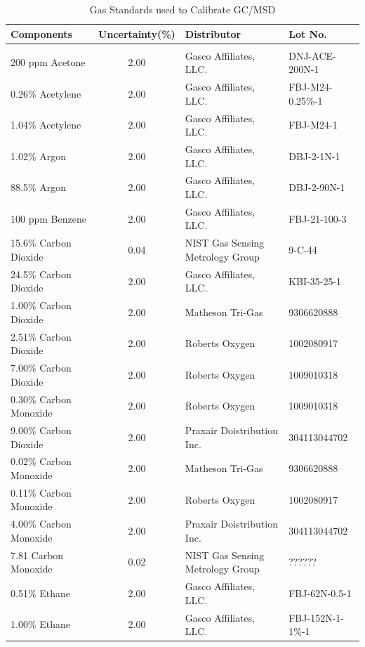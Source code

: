 \documentclass[12pt]{article}
\begin{document}
\begin{table}[h!]

\caption{Gas Standards used to Calibrate GC/MSD}
\label{tab:Gas_Standards_Table}
\centering
	\footnotesize
	\begin{tabular}{lcll}
			\hline
\textbf{Components} &\textbf{Uncertainty(\%)}& \textbf{Distributor}	& \textbf{Lot No.}		\\
\hline
\\[0.001cm]
200 ppm Acetone		&	2.00	&	Gasco Affiliates, LLC. 		&	DNJ-ACE-200N-1		\\
0.26\% Acetylene		&	2.00	&	Gasco Affiliates, LLC.		&	FBJ-M24-0.25\%-1		\\
1.04\% Acetylene		&	2.00	&	Gasco Affiliates, LLC.		&	FBJ-M24-1		\\
1.02\% Argon			&	2.00	&	Gasco Affiliates, LLC.		&	DBJ-2-1N-1		\\
88.5\% Argon			&	2.00	&	Gasco Affiliates, LLC.		&	DBJ-2-90N-1		\\
100 ppm Benzene		&	2.00	&	Gasco Affiliates, LLC.		&	FBJ-21-100-3		\\
15.6\% Carbon Dioxide	&	0.04	&	NIST Gas Sensing Metrology Group		&	9-C-44		\\
24.5\% Carbon Dioxide	&	2.00	&	Gasco Affiliates, LLC. 		&	KBI-35-25-1		\\
1.00\% Carbon Dioxide	&	2.00	&	Matheson Tri-Gas		&	9306620888		\\
2.51\% Carbon Dioxide	&	2.00	&	Roberts Oxygen			&	1002080917		\\
7.00\% Carbon Dioxide	&	2.00	&	Roberts Oxygen			&	1009010318		\\
0.30\% Carbon Monoxide	&	2.00	&	Roberts Oxygen			&	1009010318			\\
9.00\% Carbon Dioxide	&	2.00	&	Praxair Doistribution Inc. 	&	304113044702		\\
0.02\% Carbon Monoxide	&	2.00	&	Matheson Tri-Gas		&	9306620888		\\
0.11\% Carbon Monoxide	&	2.00	&	Roberts Oxygen			&	1002080917		\\
4.00\% Carbon Monoxide	&	2.00	&	Praxair Doistribution Inc. 	&	304113044702		\\
7.81 Carbon Monoxide	&	0.02	&	NIST Gas Sensing Metrology Group 		&	??????		\\
0.51\% Ethane			&	2.00	&	Gasco Affiliates, LLC.		&	FBJ-62N-0.5-1		\\
1.00\% Ethane			&	2.00	&	Gasco Affiliates, LLC.		&	FBJ-152N-1-1\%-1		\\

\end{tabular}
\end{table}
\end{document}
